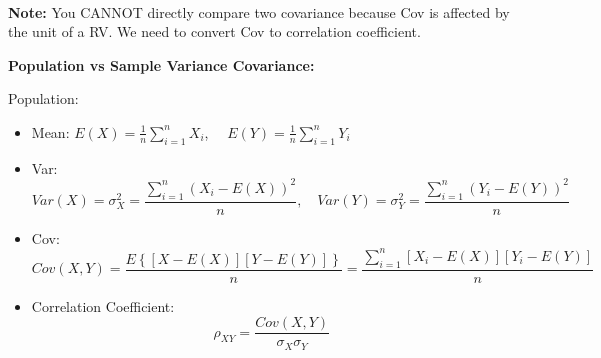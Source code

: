 \documentclass[12pt]{article}
\begin{document}
\noindent{}\\


{\textbf {Note:}} You CANNOT directly compare two covariance because Cov is affected
by the unit of a RV. We need to convert Cov to correlation coefficient.


{\textbf {Population vs Sample Variance Covariance:}}

Population:
\begin{itemize}
\item Mean:
		$ E(X) = \frac{1}{n}\sum\limits_{i = 1} ^n X_{i}	 $, 
		$\quad E(Y) = \frac{1}{n}\sum\limits_{i = 1} ^n Y_{i}	 $
\item Var:
		\begin{equation*}
		Var(X) =\sigma_{X}^{2} =  \frac{\sum\limits_{i = 1} ^n (X_{i} - E(X))^{2}	}{n}, \quad
    Var(Y) =\sigma_{Y}^{2} =  \frac{\sum\limits_{i = 1} ^n (Y_{i} - E(Y))^{2}	}{n}
		\end{equation*}
\item Cov:
		\begin{equation*}
				Cov(X,Y) = \frac{E \left\{ [X - E(X)][Y - E(Y)] \right\} }{n}
				= \frac{\sum\limits_{i = 1} ^n [X_{i} - E(X)][Y_{i} - E(Y)]	}{n}
		\end{equation*}
\item Correlation Coefficient:
		\begin{equation*}
		\rho_{XY} = \frac{Cov(X,Y)}{\sigma_{X}\sigma_{Y}}
		\end{equation*}
\end{itemize}
\end{document}
